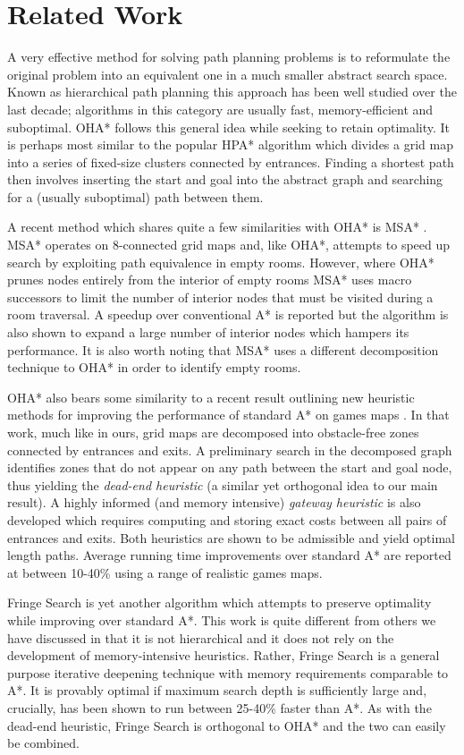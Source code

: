 \section{Related Work}
A very effective method for solving path planning problems is to reformulate the original problem
into an equivalent one in a much smaller abstract search space. 
Known as hierarchical path planning this approach has been well studied over the last decade;
algorithms in this category are usually fast, memory-efficient and suboptimal.
OHA* follows this general idea while seeking to retain optimality.
It is perhaps most similar to the popular HPA* algorithm \cite{botea04} 
which divides a grid map into a series of fixed-size clusters connected 
by entrances.
Finding a shortest path then involves inserting the start and goal into the 
abstract graph and searching for a (usually suboptimal) path between them.
\par
A recent method which shares quite a few similarities with OHA* is MSA* \cite{bolanca09}.
MSA* operates on 8-connected grid maps and, like OHA*, 
attempts to speed up search by exploiting path equivalence in empty rooms.
However, where OHA* prunes nodes entirely from the interior of empty rooms 
MSA* uses macro successors to limit the number of interior nodes that must 
be visited during a room traversal.
A speedup over conventional A* is reported but the algorithm is also
shown to expand a large number of interior nodes which hampers its performance.
It is also worth noting that MSA* uses a different decomposition 
technique to OHA* in order to identify empty rooms.
\par
OHA* also bears some similarity to a recent result outlining new heuristic methods for improving the 
performance of standard A* on games maps \cite{bjornsson06}.
In that work, much like in ours, grid maps are decomposed into obstacle-free zones connected by entrances 
and exits. 
A preliminary search in the decomposed graph identifies zones that do not appear 
on any path between the start and goal node, thus yielding the \emph{dead-end heuristic} 
(a similar yet orthogonal idea to our main result).
A highly informed (and memory intensive) \emph{gateway heuristic} is also developed which 
requires computing and storing exact costs between all pairs of entrances and exits.
Both heuristics are shown to be admissible and yield optimal length paths. 
Average running time improvements over standard A* are reported at between 10-40\% using a range of
realistic games maps.
\par
Fringe Search is yet another algorithm which attempts to preserve optimality
while improving over standard A*.
This work is quite different from others we have discussed in that it is not 
hierarchical and it does not rely on the development of memory-intensive heuristics.
Rather, Fringe Search is a general purpose iterative deepening technique with memory requirements
comparable to A*. 
It is provably optimal if maximum search depth is sufficiently large and, crucially, has been shown to 
run between 25-40\% faster than A*.
As with the dead-end heuristic, Fringe Search is orthogonal to OHA* and the two
can easily be combined.

